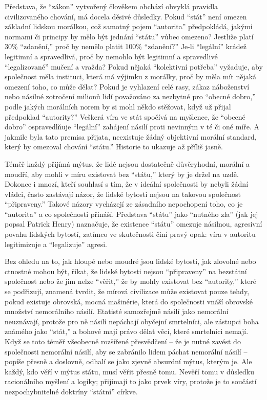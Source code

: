 \documentclass{book}
\begin{document}
Představa, že \enquote{zákon} vytvořený člověkem obchází obvyklá pravidla civilizovaného chování, má docela děsivé důsledky. Pokud \enquote{stát} není omezen základní lidskou morálkou, což samotný pojem \enquote{autorita} předpokládá, jakými normami či principy by mělo být jednání \enquote{státu} vůbec omezeno? Jestliže platí 30\% \enquote{zdanění,} proč by nemělo platit 100\% \enquote{zdanění?} Je-li \enquote{legální} krádež legitimní a spravedlivá, proč by nemohlo být legitimní a spravedlivé \enquote{legalizované} mučení a vražda? Pokud nějaká \enquote{kolektivní potřeba} vyžaduje, aby společnost měla instituci, která má výjimku z morálky, proč by měla mít nějaká omezení toho, co může dělat? Pokud je vyhlazení celé rasy, zákaz náboženství nebo násilné zotročení milionů lidí považováno za nezbytné pro \enquote{obecné dobro,} podle jakých morálních norem by si mohl někdo stěžovat, když už přijal předpoklad \enquote{autority?} Veškerá víra ve stát spočívá na myšlence, že \enquote{obecné dobro} ospravedlňuje \enquote{legální} zahájení násilí proti nevinným v té či oné míře. A jakmile byla tato premisa přijata, neexistuje žádný objektivní morální standard, který by omezoval chování \enquote{státu.} Historie to ukazuje až příliš jasně.

Téměř každý přijímá mýtus, že lidé nejsou dostatečně důvěryhodní, morální a moudří, aby mohli v míru existovat bez \enquote{státu,} který by je držel na uzdě. Dokonce i mnozí, kteří souhlasí s tím, že v ideální společnosti by nebyli žádní vládci, často zastávají názor, že lidské bytosti nejsou na takovou společnost \enquote{připraveny.} Takové názory vycházejí ze zásadního nepochopení toho, co je \enquote{autorita} a co společnosti přináší. Představa \enquote{státu} jako \enquote{nutného zla} (jak jej popsal Patrick Henry) naznačuje, že existence \enquote{státu} omezuje násilnou, agresivní povahu lidských bytostí, zatímco ve skutečnosti činí pravý opak: víra v autoritu legitimizuje a \enquote{legalizuje} agresi.

Bez ohledu na to, jak hloupé nebo moudré jsou lidské bytosti, jak zlovolné nebo ctnostné mohou být, říkat, že lidské bytosti nejsou \enquote{připraveny} na bezstátní společnost nebo že jim nelze \enquote{věřit,} že by mohly existovat bez \enquote{autority,} které se podřizují, znamená tvrdit, že mírová civilizace může existovat pouze tehdy, pokud existuje obrovská, mocná mašinérie, která do společnosti vnáší obrovské množství nemorálního násilí. Etatisté samozřejmě násilí jako nemorální neuznávají, protože pro ně násilí nepáchají obyčejní smrtelníci, ale zástupci boha známého jako \enquote{stát,} a bohové mají právo dělat věci, které smrtelníci nemají. Když se toto téměř všeobecně rozšířené přesvědčení -- že je nutné zavést do společnosti nemorální násilí, aby se zabránilo lidem páchat nemorální násilí -- popíše přesně a doslovně, odhalí se jako zjevně absurdní mýtus, kterým je. Ale každý, kdo věří v mýtus státu, musí věřit přesně tomu. Nevěří tomu v důsledku racionálního myšlení a logiky; přijímají to jako prvek víry, protože je to součástí nezpochybnitelné doktríny \enquote{státní} církve.
\end{document}
